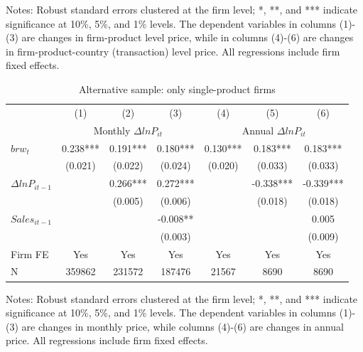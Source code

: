 \begin{table}[htbp]
{\begin{threeparttable}
\begin{tabular}{lcccccc}
        \bottomrule
    \end{tabular}
        \begin{tablenotes}
            \footnotesize
            \item Notes: Robust standard errors clustered at the firm level;  *, **, and *** indicate significance at 10\%, 5\%, and 1\% levels. The dependent variables in columns (1)-(3) are changes in firm-product level price, while in columns (4)-(6) are changes in firm-product-country (transaction) level price. All regressions include firm fixed effects.
	\end{tablenotes}
    \end{threeparttable}
    }
    \label{tab.altagg}
\end{table}

\begin{table}[htbp]
    \centering
    \caption{Alternative sample: only single-product firms}
    \begin{threeparttable}
    \begin{tabular}{lcccccc}
        \toprule
        & (1)   & (2)   & (3)   & (4)   & (5)   & (6) \\
        & \multicolumn{3}{c}{Monthly $\Delta ln P_{it}$} & \multicolumn{3}{c}{Annual $\Delta ln P_{it}$}  \\
        \midrule
        $brw_t$   & 0.238*** & 0.191*** & 0.180*** & 0.130*** & 0.183*** & 0.183*** \\
              & (0.021) & (0.022) & (0.024) & (0.020) & (0.033) & (0.033) \\
        $\Delta ln P_{it-1}$ &       & 0.266*** & 0.272*** &       & -0.338*** & -0.339***\\
              &       & (0.005) & (0.006) &       &   (0.018) & (0.018) \\
        $Sales_{it-1}$ &       &       & -0.008** &       &       & 0.005  \\
              &       &       & (0.003) &       &       &  (0.009) \\
        \midrule
        Firm FE & Yes   & Yes   & Yes   & Yes   & Yes   & Yes \\
        N     & 359862 & 231572 & 187476 & 21567 & 8690  & 8690 \\
        \bottomrule
    \end{tabular}
        \begin{tablenotes}
            \footnotesize
            \item Notes: Robust standard errors clustered at the firm level;  *, **, and *** indicate significance at 10\%, 5\%, and 1\% levels. The dependent variables in columns (1)-(3) are changes in monthly price, while columns (4)-(6) are changes in annual price. All regressions include firm fixed effects.
	\end{tablenotes}
    \end{threeparttable}
    \label{tab.single}
\end{table}

